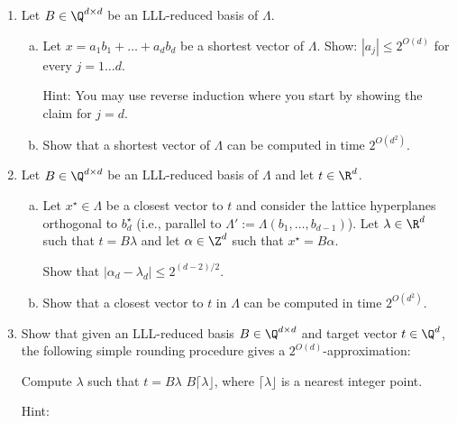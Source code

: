 \begin{enumerate}
  \item
    Let $B \in \Q^{d \times d}$ be an LLL-reduced basis of $\Lambda$.
    \begin{enumerate}[(a)]
      \item Let $x = a_1 b_1 + \dots + a_d b_d$ be a shortest vector of $\Lambda$.
        Show: $|a_j| \leq 2^{O(d)}$ for every $j = 1 \dots d$.

        Hint: You may use reverse induction where you start by showing the claim for $j = d$.

      \item Show that a shortest vector of $\Lambda$ can be computed in time $2^{O(d^2)}$.
    \end{enumerate}

  \item
    Let $B \in \Q^{d \times d}$ be an LLL-reduced basis of $\Lambda$ and let $t \in \R^d$.
    \begin{enumerate}[(a)]
      \item Let $x^\star \in \Lambda$ be a closest vector to $t$ and consider the lattice hyperplanes
        orthogonal to $b_d^\star$ (i.e., parallel to $\Lambda' := \Lambda(b_1,\ldots,b_{d-1})$).
        Let $\lambda \in \R^d$ such that $t = B \lambda$
        and let $\alpha \in \Z^d$ such that $x^\star = B \alpha$.

        Show that $|\alpha_d - \lambda_d| \leq 2^{(d-2)/2}$.

      \item Show that a closest vector to $t$ in $\Lambda$ can be computed in time $2^{O(d^2)}$.
    \end{enumerate}

  \item
    Show that given an LLL-reduced basis $B \in \Q^{d \times d}$ and target vector $t \in \Q^d$,
    the following simple rounding procedure gives a $2^{O(d)}$-approximation:
    \begin{codebox}
      \li Compute $\lambda$ such that $t = B \lambda$
      \li \Return $B \lceil \lambda \rfloor$, where $\lceil \lambda \rfloor$ is a nearest integer point.
    \end{codebox}

    Hint: \cite{MR856638}
\end{enumerate}
